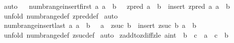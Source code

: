 \begin{isabellebody}
\isamarkupfalse%
\ auto\isanewline
{}\isamarkupfalse%
%
\endisatagproof
{\isafoldproof}%
%
\isadelimproof
\isanewline
%
\endisadelimproof
\isanewline
\ \isanewline
{}\isamarkupfalse%
\ numb{\isacharunderscore}range{\isacharunderscore}insert{\isacharunderscore}first{\isacharcolon}\ {\isachardoublequoteopen}{\isacharbang}{\isacharbang}a{\isachardot}\ a\ {\isacharless}{\isacharequal}\ b\ {\isacharequal}{\isacharequal}{\isachargreater}\ \ {\isacharparenleft}{\isacharparenleft}zpred\ a{\isacharparenright}\ {\isachardot}{\isachardot}\ b{\isacharparenright}\ {\isacharequal}\ insert\ {\isacharparenleft}zpred\ a{\isacharparenright}\ {\isacharparenleft}a\ {\isachardot}{\isachardot}\ b{\isacharparenright}{\isachardoublequoteclose}\isanewline
%
\isadelimproof
%
\endisadelimproof
%
\isatagproof
{}\isamarkupfalse%
\ {\isacharparenleft}unfold\ numb{\isacharunderscore}range{\isacharunderscore}def\ zpred{\isacharunderscore}def{\isacharparenright}\isanewline
{}\isamarkupfalse%
\ auto\isanewline
{}\isamarkupfalse%
%
\endisatagproof
{\isafoldproof}%
%
\isadelimproof
\isanewline
%
\endisadelimproof
\ \isanewline
{}\isamarkupfalse%
\ numb{\isacharunderscore}range{\isacharunderscore}insert{\isacharunderscore}last{\isacharcolon}\ {\isachardoublequoteopen}{\isacharbang}{\isacharbang}a{\isachardot}\ a\ {\isacharless}{\isacharequal}\ b\ {\isacharequal}{\isacharequal}{\isachargreater}\ \ {\isacharparenleft}a\ {\isachardot}{\isachardot}\ {\isacharparenleft}zsuc\ b{\isacharparenright}{\isacharparenright}\ {\isacharequal}\ insert\ {\isacharparenleft}zsuc\ b{\isacharparenright}\ {\isacharparenleft}a\ {\isachardot}{\isachardot}\ b{\isacharparenright}{\isachardoublequoteclose}\isanewline
%
\isadelimproof
%
\endisadelimproof
%
\isatagproof
{}\isamarkupfalse%
\ {\isacharparenleft}unfold\ numb{\isacharunderscore}range{\isacharunderscore}def\ zsuc{\isacharunderscore}def{\isacharparenright}\isanewline
{}\isamarkupfalse%
\ auto\isanewline
{}\isamarkupfalse%
%
\endisatagproof
{\isafoldproof}%
%
\isadelimproof
\isanewline
%
\endisadelimproof
\isanewline
{}\isamarkupfalse%
\ zadd{\isacharunderscore}to{\isacharunderscore}zdiff{\isacharunderscore}zle{\isacharcolon}\ {\isachardoublequoteopen}{\isacharparenleft}{\isacharparenleft}a{\isacharcolon}{\isacharcolon}int{\isacharparenright}\ {\isacharless}{\isacharequal}\ b\ {\isacharplus}\ c{\isacharparenright}\ {\isacharequal}\ {\isacharparenleft}a\ {\isacharminus}\ c\ {\isacharless}{\isacharequal}\ b{\isacharparenright}{\isachardoublequoteclose}\isanewline

\end{isabellebody}
